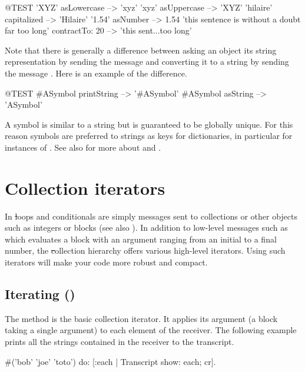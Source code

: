 \documentclass[a4paper,10pt,twoside]{book}
\begin{document}
\begin{code}{@TEST}
'XYZ' asLowercase --> 'xyz'
'xyz' asUppercase   --> 'XYZ'
'hilaire' capitalized   --> 'Hilaire'
'1.54' asNumber      --> 1.54
'this sentence is without a doubt far too long' contractTo: 20 --> 'this sent...too long'
\end{code}

Note that there is generally a difference between asking an object its string representation by sending the message  and converting it to a string by sending the message .
Here is an example of the difference.

\begin{code}{@TEST}
#ASymbol printString --> '#ASymbol'
#ASymbol asString    --> 'ASymbol'
\end{code}

A symbol is similar to a string but is guaranteed to be globally unique.  For this reason symbols are preferred to strings as keys for dictionaries, in particular for instances of .
See also  for more about  and .

\section{Collection iterators}

In \st loops and conditionals are simply messages sent to collections or other objects such as integers or blocks (see also ). In addition to low-level messages such as  which evaluates a block with an argument ranging from an initial to a final number, the \st collection hierarchy offers various high-level iterators. Using such iterators will make your code more robust and compact. 

\subsection{Iterating ()}
The method  is the basic collection iterator. It applies its argument (a block taking a single argument) to each element of the receiver.
The following example prints all the strings contained in the receiver to the transcript.

\begin{code}{}
#('bob' 'joe' 'toto') do: [:each | Transcript show: each; cr].
\end{code}
\end{document}
